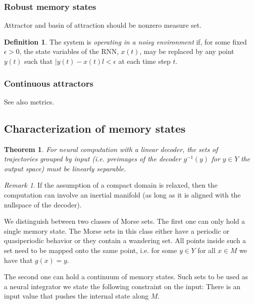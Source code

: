 \documentclass{scrartcl}
\newtheorem{theorem}{Theorem}
\theoremstyle{definition}
\newtheorem{definition}{Definition}
\theoremstyle{remark}
\newtheorem{remark}{Remark}
\begin{document}
\subsubsection{Robust memory states}
Attractor and basin of attraction should be nonzero measure set.

\begin{definition}
The system is \emph{operating in a noisy environment} if, for some fixed $\epsilon > 0$, the state variables of the RNN, $x(t)$, may be replaced by any point $y(t)$ such that $|y(t) - x(t)l < \epsilon$ at each time step $t$.
\end{definition}

\subsubsection{Continuous attractors}%
See also metrics.


\subsection{Characterization of memory states}

\begin{theorem}
For neural computation with a linear decoder, the sets of trajectories grouped by input (i.e. preimages of the decoder $g^{-1}(y)$ for $y\in Y$ the output space) must be linearly separable.
\end{theorem}

\begin{remark}
If the assumption of a compact domain is relaxed, then the computation can involve an inertial manifold (as long as it is aligned with the nullspace of the decoder).
\end{remark}

We distinguish between two classes of Morse sets.
The first one can only hold a single memory state. 
The Morse sets in this class either have a periodic or quasiperiodic behavior or they contain a wandering set.
All points inside such a set need to be mapped onto the same point, i.e. for some $y\in Y$ for all $x\in M$ we have that $g(x)=y$.

The second one can hold a continuum of memory states. %
Such sets to be used as a neural integrator we state the following constraint on the input:
There is an input value that pushes the internal state along $M$.
\end{document}
